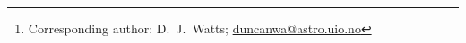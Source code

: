 \newcommand{\oslo}[0]{1}
\newcommand{\milanoA}[0]{2}
\newcommand{\milanoB}[0]{3}
\newcommand{\milanoC}[0]{4}
\newcommand{\triesteB}[0]{5}
\newcommand{\planetek}[0]{6}
\newcommand{\princeton}[0]{7}
\newcommand{\jpl}[0]{8}
\newcommand{\helsinkiA}[0]{9}
\newcommand{\helsinkiB}[0]{10}
\newcommand{\nersc}[0]{11}
\newcommand{\haverford}[0]{12}
\newcommand{\mpa}[0]{13}
\newcommand{\triesteA}[0]{14}

\author{\small
D.~J.~Watts\inst{\oslo}\thanks{Corresponding author: D.~J.~Watts; \url{duncanwa@astro.uio.no}}
\and
et al.
}

